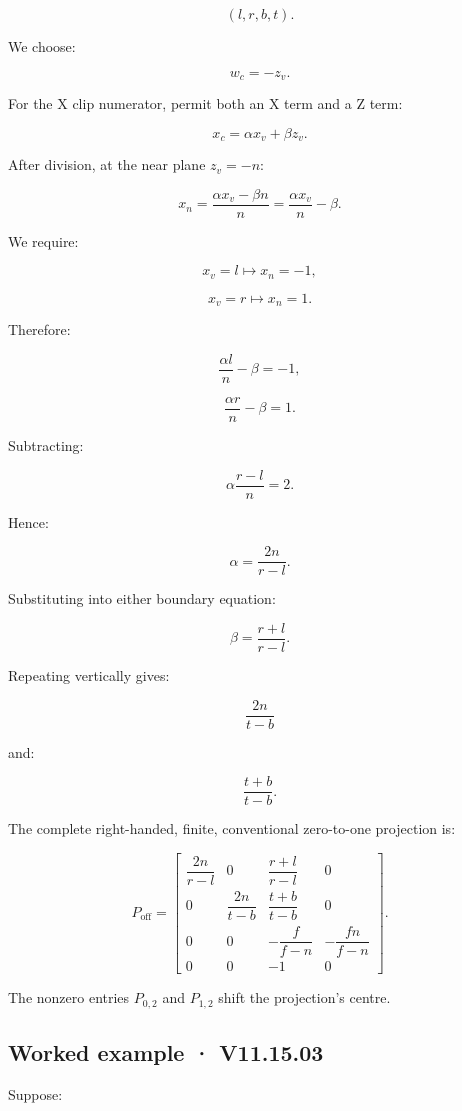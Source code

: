 \[ (l,r,b,t). \]

We choose:

\[ w_c=-z_v. \]

For the X clip numerator, permit both an X term and a Z term:

\[ x_c=\alpha x_v+\beta z_v. \]

After division, at the near plane \(z_v=-n\):

\[ x_n=\frac{\alpha x_v-\beta n}{n} =\frac{\alpha x_v}{n}-\beta. \]

We require:

\[ x_v=l\longmapsto x_n=-1, \]

\[ x_v=r\longmapsto x_n=1. \]

Therefore:

\[ \frac{\alpha l}{n}-\beta=-1, \]

\[ \frac{\alpha r}{n}-\beta=1. \]

Subtracting:

\[ \alpha\frac{r-l}{n}=2. \]

Hence:

\[ \boxed{\alpha=\frac{2n}{r-l}}. \]

Substituting into either boundary equation:

\[ \boxed{\beta=\frac{r+l}{r-l}}. \]

Repeating vertically gives:

\[ \frac{2n}{t-b} \]

and:

\[ \frac{t+b}{t-b}. \]

The complete right-handed, finite, conventional zero-to-one projection is:

\[ \boxed{ P_{\mathrm{off}}= \begin{bmatrix} \dfrac{2n}{r-l}&0&\dfrac{r+l}{r-l}&0\\ 0&\dfrac{2n}{t-b}&\dfrac{t+b}{t-b}&0\\ 0&0&-\dfrac f{f-n}&-\dfrac{fn}{f-n}\\ 0&0&-1&0 \end{bmatrix}. } \]

The nonzero entries \(P_{0,2}\) and \(P_{1,2}\) shift the projection's centre.

\subsection{Worked example · V11.15.03}\label{02-foundations-ii-ch035-worked-example-v11.15.03}

Suppose:

